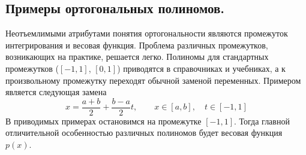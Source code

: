 \documentclass[../../calc-math-exam-2023.tex]{subfiles}
\begin{document}
    \subsection{Примеры ортогональных полиномов.}
    Неотъемлимыми атрибутами понятия ортогональности являются промежуток интегрирования и
    весовая функция. Проблема различных промежутков, возникающих на практике, решается легко.
    Полиномы для стандартных промежутков ($[-1, 1]$, $[0, 1]$) приводятся в справочниках и
    учебниках, а к произвольному промежутку переходят обычной заменой переменных. Примером
    является следующая замена
    \begin{equation*}
        x = \frac{a + b}{2} + \frac{b - a}{2}t, \qquad x \in [a, b], \quad t \in [-1, 1]
    \end{equation*}
    В приводимых примерах остановимся на промежутке $[-1, 1]$. Тогда главной отличительной
    особенностью различных полиномов будет весовая функция $p(x)$.
\end{document}
